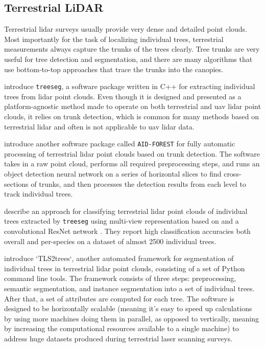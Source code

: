 \subsection{Terrestrial LiDAR}

Terrestrial \gls{lidar} surveys usually provide very dense and detailed point clouds.
Most importantly for the task of localizing individual trees, terrestrial measurements always capture the trunks of the trees clearly.
Tree trunks are very useful for tree detection and segmentation, and there are many algorithms that use bottom-to-top approaches that trace the trunks into the canopies.

\citet{burtExtractingIndividualTrees2018} introduce \texttt{treeseg}, a software package written in C++ for extracting individual trees from \gls{lidar} point clouds.
Even though it is designed and presented as a platform-agnostic method made to operate on both terrestrial and \gls{uav} \gls{lidar} point clouds, it relies on trunk detection, which is common for many methods based on terrestrial \gls{lidar} and often is not applicable to \gls{uav} \gls{lidar} data.

\citet{lopezserranoArtificialIntelligencebasedSoftware2022} introduce another software package called \texttt{AID-FOREST} for fully automatic processing of terrestrial \gls{lidar} point clouds based on trunk detection.
The software takes in a raw point cloud, performs all required preprocessing steps, and runs an object detection neural network on a series of horizontal slices to find cross-sections of trunks, and then processes the detection results from each level to track individual trees.

\citet{allenTreeSpeciesClassification2022} describe an approach for classifying terrestrial \gls{lidar} point clouds of individual trees extracted by \texttt{treeseg} using multi-view representation based on \citet{goyalRevisitingPointCloud2021} and a convolutional ResNet network \citep{heDeepResidualLearning2016}.
They report high classification accuracies both overall and per-species on a dataset of almost 2500 individual trees.

\citet{wilkesTLS2treesScalableTree2023} introduce `TLS2trees`, another automated framework for segmentation of individual trees in terrestrial \gls{lidar} point clouds, consisting of a set of Python command line tools.
The framework consists of three steps: preprocessing, semantic segmentation, and instance segmentation into a set of individual trees.
After that, a set of attributes are computed for each tree.
The software is designed to be horizontally scalable (meaning it's easy to speed up calculations by using more machines doing them in parallel, as opposed to vertically, meaning by increasing the computational resources available to a single machine) to address huge datasets produced during terrestrial laser scanning surveys.

